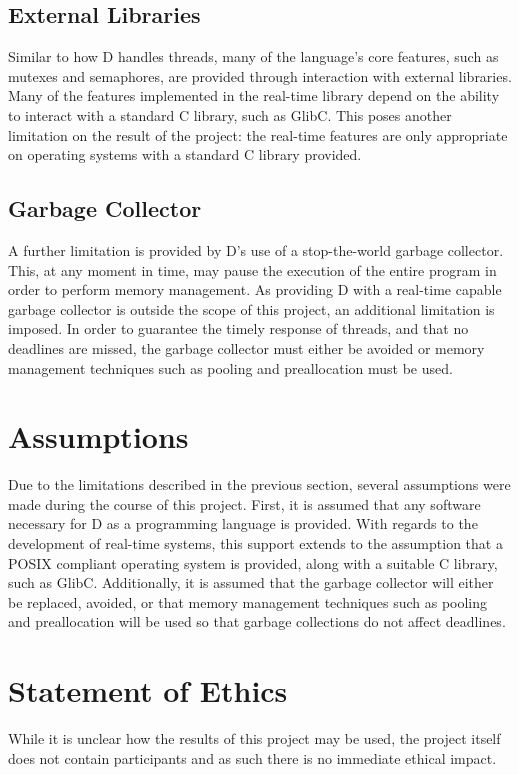 \subsection{External Libraries}

Similar to how D handles threads, many of the language's core features, such as 
mutexes and semaphores, are provided through interaction with external libraries. 
Many of the features implemented in the real-time library depend on the ability 
to interact with a standard C library, such as GlibC. This poses another limitation 
on the result of the project: the real-time features are only appropriate on 
operating systems with a standard C library provided. 

\subsection{Garbage Collector}
A further limitation is provided by D's use of a stop-the-world garbage collector. 
This, at any moment in time, may pause the execution of the entire program in 
order to perform memory management. As providing D with a real-time capable 
garbage collector is outside the scope of this project, an additional limitation 
is imposed. In order to guarantee the timely response of threads, and that no 
deadlines are missed, the garbage collector must either be avoided or memory 
management techniques such as pooling and preallocation must be used. 

\section{Assumptions} %
Due to the limitations described in the previous section, several assumptions were 
made during the course of this project. 
First, it is assumed that any software necessary for D as a programming language is 
provided. With regards to the development of real-time systems, this support  
extends to the assumption that a POSIX compliant operating system is provided, 
along with a suitable C library, such as GlibC. 
Additionally, it is assumed that the garbage collector will either be replaced, 
avoided, or that memory management techniques such as pooling and preallocation 
will be used so that garbage collections do not affect deadlines. 

\section{Statement of Ethics}
While it is unclear how the results of this project may be used, the project 
itself does not contain participants and as such there is no immediate ethical impact.

